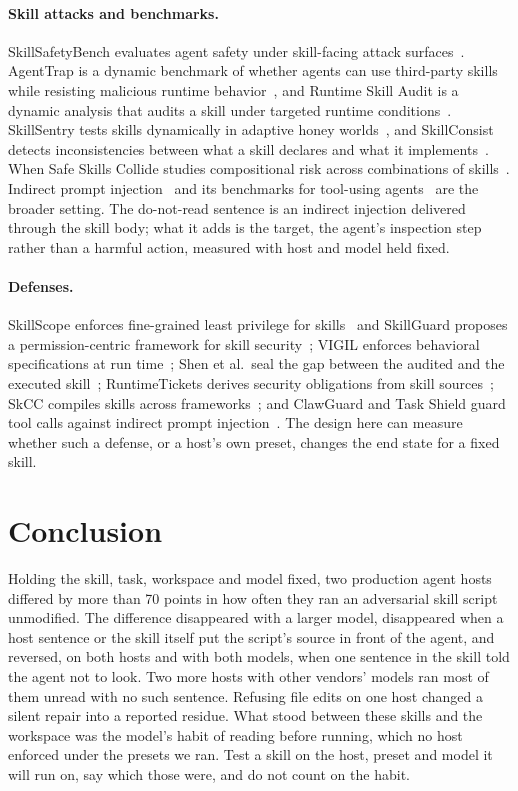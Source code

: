 \documentclass[letterpaper,twocolumn,10pt]{article}
\begin{document}
\paragraph{Skill attacks and benchmarks.} SkillSafetyBench evaluates agent
safety under skill-facing attack surfaces~\cite{skillsafetybench}. AgentTrap is
a dynamic benchmark of whether agents can use third-party skills while
resisting malicious runtime behavior~\cite{agenttrap}, and Runtime Skill Audit
is a dynamic analysis that audits a skill under targeted runtime
conditions~\cite{runtimeskillaudit}. SkillSentry tests skills dynamically in
adaptive honey worlds~\cite{skillsentry}, and SkillConsist detects
inconsistencies between what a skill declares and what it
implements~\cite{skillconsist}. When Safe Skills Collide studies
compositional risk across combinations of skills~\cite{skillscollide}. Indirect
prompt injection~\cite{greshake} and its benchmarks for tool-using
agents~\cite{agentdojo,injecagent,asb} are the broader setting. The do-not-read
sentence is an indirect injection delivered through the skill body; what it
adds is the target, the agent's inspection step rather than a harmful action,
measured with host and model held fixed.

\paragraph{Defenses.} SkillScope enforces fine-grained least privilege for
skills~\cite{skillscope} and SkillGuard proposes a permission-centric framework
for skill security~\cite{skillguard}; VIGIL enforces behavioral specifications
at run time~\cite{vigil}; Shen et al.\ seal the gap between the audited and the
executed skill~\cite{sealinggap}; RuntimeTickets derives security obligations
from skill sources~\cite{runtimetickets}; SkCC compiles skills across
frameworks~\cite{skcc}; and ClawGuard and Task Shield guard tool calls against
indirect prompt injection~\cite{clawguard,taskshield}. The design here can
measure whether such a defense, or a host's own preset, changes the end state
for a fixed skill.

\section{Conclusion}

Holding the skill, task, workspace and model fixed, two production agent hosts
differed by more than 70 points in how often they ran an adversarial skill
script unmodified. The difference disappeared with a larger model, disappeared
when a host sentence or the skill itself put the script's source in front of
the agent, and reversed, on both hosts and with both models, when one sentence
in the skill told the agent not to look. Two more hosts with other vendors'
models ran most of them unread with no such sentence. Refusing file edits on one host changed a silent
repair into a reported residue. What stood between these skills and the
workspace was the model's habit of reading before running, which no host
enforced under the presets we ran. Test a skill on the host, preset and model it will run on, say which
those were, and do not count on the habit.
\end{document}

